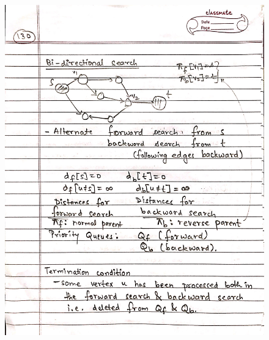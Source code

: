 \begin{figure}[H]
    \centering
    \includegraphics[width=16cm, height=21cm]{"./MIT-6.006/MIT-6006-130"}
\end{figure}
\newpage
